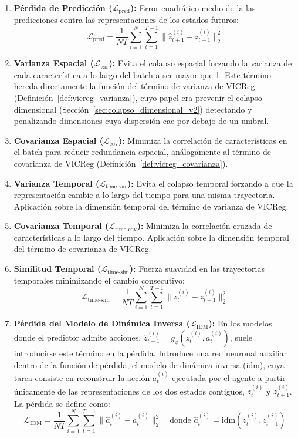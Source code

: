 \begin{enumerate}
    \item \textbf{Pérdida de Predicción ($\mathcal{L}_{\text{pred}}$):} Error cuadrático medio de la las predicciones contra las representaciones de los estados futuros:
    \begin{equation}
    \mathcal{L}_{\text{pred}} = \frac{1}{NT} \sum_{i=1}^{N} \sum_{t=1}^{T-1} \| \hat{z}_{t+1}^{(i)} - z_{t+1}^{(i)} \|_2^2
    \end{equation}
    \item \textbf{Varianza Espacial ($\mathcal{L}_{\text{var}}$):} Evita el colapso espacial forzando la varianza de cada característica a lo largo del batch a ser mayor que 1. Este término hereda directamente la función del término de varianza de VICReg (Definición~\ref{def:vicreg_varianza}), cuyo papel era prevenir el colapso dimensional (Sección~\ref{sec:colapso_dimensional_v2}) detectando y penalizando dimensiones cuya dispersión cae por debajo de un umbral.
    \item \textbf{Covarianza Espacial ($\mathcal{L}_{\text{cov}}$):} Minimiza la correlación de características en el batch para reducir redundancia espacial, análogamente al término de covarianza de VICReg (Definición~\ref{def:vicreg_covarianza}).
    \item \textbf{Varianza Temporal ($\mathcal{L}_{\text{time-var}}$):} Evita el colapso temporal forzando a que la representación cambie a lo largo del tiempo para una misma trayectoria. Aplicación sobre la dimensión temporal del término de varianza de  VICReg.
    \item \textbf{Covarianza Temporal ($\mathcal{L}_{\text{time-cov}}$):} Minimiza la correlación cruzada de características a lo largo del tiempo. Aplicación sobre la dimensión temporal del término de covarianza de VICReg.
    \item \textbf{Similitud Temporal ($\mathcal{L}_{\text{time-sim}}$):} Fuerza suavidad en las trayectorias temporales minimizando el cambio consecutivo:
    \begin{equation}
    \mathcal{L}_{\text{time-sim}} = \frac{1}{NT} \sum_{i=1}^{N} \sum_{t=1}^{T-1} \| z_t^{(i)} - z_{t+1}^{(i)} \|_2^2
    \end{equation}
    \item \textbf{Pérdida del Modelo de Dinámica Inversa ($\mathcal{L}_{\text{IDM}}$):} En los modelos donde el predictor admite acciones, $\hat{z}_{t+1}^{(i)} = g_{\phi}(z_t^{(i)}, a_t^{(i)})$, suele introducirse este término en la pérdida. Introduce una red neuronal auxiliar dentro de la función de pérdida, el modelo de dinámica inversa ($\text{idm}$), cuya tarea consiste en reconstruir la acción $a_t^{(i)}$ ejecutada por el agente a partir únicamente de las representaciones de los dos estados contiguos, $z_t^{(i)}$ y $z_{t+1}^{(i)}$. La pérdida se define como:
    \begin{equation}
    \mathcal{L}_{\text{IDM}} = \frac{1}{NT} \sum_{i=1}^{N} \sum_{t=1}^{T-1} \| \hat{a}_t^{(i)} - a_t^{(i)} \|_2^2 \quad \text{donde } \hat{a}_t^{(i)} = \text{idm}(z_t^{(i)}, z_{t+1}^{(i)})
    \end{equation}
\end{enumerate}

